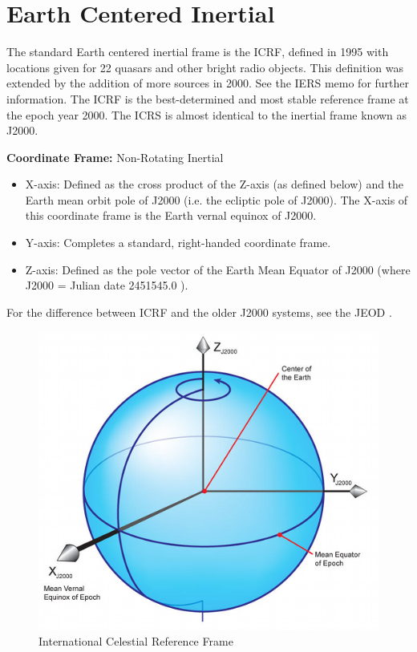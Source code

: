 \section{Earth Centered Inertial} \label{sec:icrf} 
The standard Earth centered inertial frame is the ICRF, defined in 1995 with locations given for 22 quasars and other bright radio objects. This definition was extended by the addition of more sources in 2000. See the IERS memo \cite{IERS2003} for further information. The ICRF is the best-determined and most stable reference frame at the epoch year 2000. The ICRS is almost identical to the inertial frame known as J2000.

\textbf{Coordinate Frame: } Non-Rotating Inertial

\begin{itemize}
\item X-axis: Defined as the cross product of the Z-axis (as defined below) and the Earth mean orbit pole of J2000 (i.e. the ecliptic pole of J2000). The X-axis of this coordinate frame is the Earth vernal equinox of J2000.
\item Y-axis: Completes a standard, right-handed coordinate frame.
\item Z-axis: Defined as the pole vector of the Earth Mean Equator of J2000
(where J2000 = Julian date 2451545.0 ).
\end{itemize}
For the difference between ICRF and the older J2000 systems, see the JEOD \hyperTLD.


\begin{figure}[htp]
\centering
\includegraphics [width=7in]{figs/fig4.png}
\caption{International Celestial Reference Frame}
\label{fig:4}
\end{figure}

